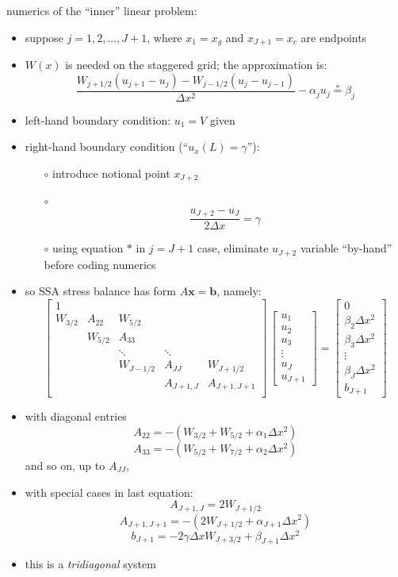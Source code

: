 \documentclass[titlepage,letterpaper,final,11pt]{scrartcl}
\begin{document}
numerics of the ``inner'' linear problem:

\begin{itemize}
\item suppose $j=1,2,\dots,J+1$, where $x_1 = x_g$ and $x_{J+1} = x_c$ are endpoints
\item $W(x)$ is needed on the staggered grid; the approximation is:
$$\frac{W_{j+1/2} (u_{j+1} - u_j) - W_{j-1/2} (u_{j} - u_{j-1})}{\Delta x^2} - \alpha_j u_j \stackrel{\ast}{=} \beta_j$$
\item left-hand boundary condition: $u_1 = V$ given
\item right-hand boundary condition (``$u_x(L)=\gamma$''):
  \begin{itemize}
  \item[$\circ$] introduce notional point $x_{J+2}$
  \item[$\circ$]
    $$\frac{u_{J+2} - u_J}{2 \Delta x} = \gamma$$
  \item[$\circ$] using equation $\ast$ in $j=J+1$ case, eliminate $u_{J+2}$ variable ``by-hand'' before coding numerics \nocite{MortonMayers}
  \end{itemize}
\end{itemize}

\begin{itemize}
\item so SSA stress balance has form  \quad $A \mathbf{x} = \mathbf{b}$, \quad namely:
$$
\begin{bmatrix}
1 &  &  &  &  \\
W_{3/2} & A_{22} & W_{5/2} &  &  \\
 & W_{5/2} & A_{33} &  &  \\
 &  & \ddots & \ddots &  \\
 &  & W_{J-1/2} & A_{JJ} & W_{J+1/2} \\
 &  &  & A_{J+1,J} & A_{J+1,J+1} \\
\end{bmatrix}\,
\begin{bmatrix}
u_1 \\ u_2 \\ u_3 \\ \vdots \\ u_J \\ u_{J+1}
\end{bmatrix}
=
\begin{bmatrix}
0 \\ \beta_2 \Delta x^2 \\ \beta_3 \Delta x^2 \\ \vdots \\ \beta_J \Delta x^2 \\ b_{J+1}
\end{bmatrix}
$$
\item with diagonal entries
$$A_{22} = -(W_{3/2}+W_{5/2}+\alpha_1 \Delta x^2)$$
$$A_{33} = -(W_{5/2}+W_{7/2}+\alpha_2 \Delta x^2)$$
and so on, up to $A_{JJ}$, 
\item with special cases in last equation:
$$A_{J+1,J} = 2 W_{J+1/2}$$
$$A_{J+1,J+1} = -(2 W_{J+1/2}+\alpha_{J+1}\Delta x^2)$$
$$b_{J+1} = -2 \gamma \Delta x W_{J+3/2} + \beta_{J+1} \Delta x^2$$
\item this is a \emph{tridiagonal} system
\end{itemize}
\end{document}
